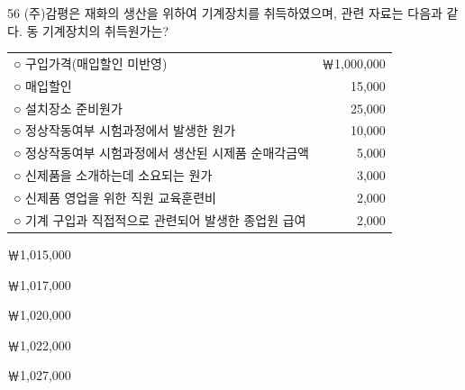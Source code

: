 \begin{question}{56}
(주)감평은 재화의 생산을 위하여 기계장치를 취득하였으며, 관련 자료는 다음과 같다. 동 기계장치의 취득원가는?
\begin{framedtext}
\begin{tabularx}{\linewidth}{@{}Xr@{}}
○ 구입가격(매입할인 미반영) & ￦1,000,000 \\
○ 매입할인 & 15,000 \\
○ 설치장소 준비원가 & 25,000 \\
○ 정상작동여부 시험과정에서 발생한 원가 & 10,000 \\
○ 정상작동여부 시험과정에서 생산된 시제품 순매각금액 & 5,000 \\
○ 신제품을 소개하는데 소요되는 원가 & 3,000 \\
○ 신제품 영업을 위한 직원 교육훈련비 & 2,000 \\
○ 기계 구입과 직접적으로 관련되어 발생한 종업원 급여 & 2,000 \\
\end{tabularx}
\end{framedtext}
\begin{choices}
  \item ￦1,015,000
  \item ￦1,017,000
  \item ￦1,020,000
  \item ￦1,022,000
  \item ￦1,027,000
\end{choices}
\end{question}
